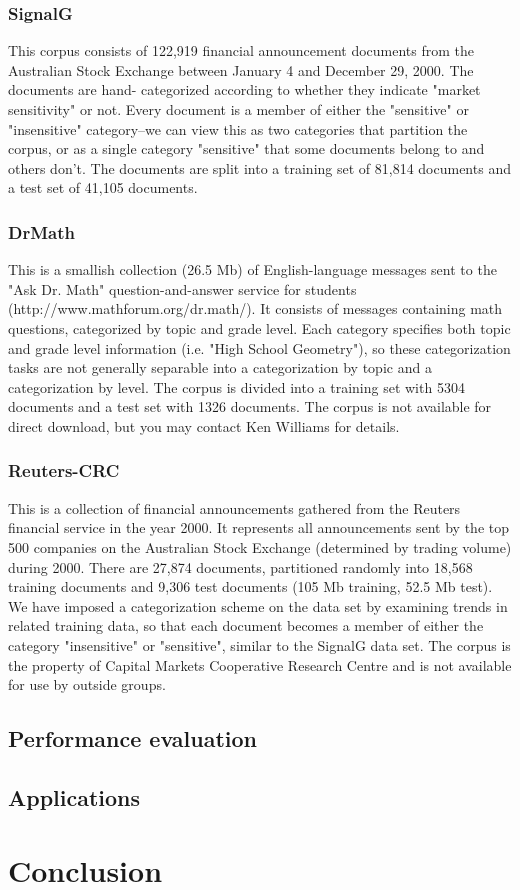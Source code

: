 \documentclass[a4paper]{report}
\begin{document}
\subsection{SignalG}
This corpus consists of 122,919 financial announcement documents from
the Australian Stock Exchange between January 4 and December 29, 2000.
The documents are hand- categorized according to whether they indicate
"market sensitivity" or not.  Every document is a member of either the
"sensitive" or "insensitive" category--we can view this as two
categories that partition the corpus, or as a single category
"sensitive" that some documents belong to and others don't.  The
documents are split into a training set of 81,814 documents and a test
set of 41,105 documents.


\subsection{DrMath}
This is a smallish collection (26.5 Mb) of English-language messages
sent to the "Ask Dr. Math" question-and-answer service for students
(http://www.mathforum.org/dr.math/).  It consists of messages
containing math questions, categorized by topic and grade level.  Each
category specifies both topic and grade level information (i.e. "High
School Geometry"), so these categorization tasks are not generally
separable into a categorization by topic and a categorization by
level.  The corpus is divided into a training set with 5304 documents
and a test set with 1326 documents.  The corpus is not available for
direct download, but you may contact Ken Williams for details.


\subsection{Reuters-CRC}
This is a collection of financial announcements gathered from the
Reuters financial service in the year 2000.  It represents all
announcements sent by the top 500 companies on the Australian Stock
Exchange (determined by trading volume) during 2000.  There are 27,874
documents, partitioned randomly into 18,568 training documents and
9,306 test documents (105 Mb training, 52.5 Mb test).  We have imposed
a categorization scheme on the data set by examining trends in related
training data, so that each document becomes a member of either the
category "insensitive" or "sensitive", similar to the SignalG data
set.  The corpus is the property of Capital Markets Cooperative
Research Centre and is not available for use by outside groups.


\section{Performance evaluation}

\section{Applications}

\chapter{Conclusion}



\end{document}
